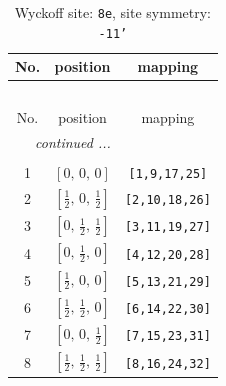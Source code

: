 \documentclass[fleqn,8pt]{jsarticle}
\begin{document}
\renewcommand{\arraystretch}{1.2}
\begin{longtable}{ccc}
\caption{Wyckoff site: {\tt 8e}, site symmetry: {\tt -11'}}
 \\
 \hline \hline
No. & position & mapping \\ \hline \endfirsthead

\multicolumn{2}{l}{\tablename\ \thetable{}} \\
 \hline \hline
No. & position & mapping \\ \hline \endhead

 \hline \hline
\multicolumn{2}{r}{\footnotesize\it continued ...} \\ \endfoot

 \hline \hline
\multicolumn{2}{r}{} \\ \endlastfoot

1 & $\left[ 0,\, 0,\, 0 \right]$ & {\tt [1,9,17,25]} \\ \hline
2 & $\left[ \frac{1}{2},\, 0,\, \frac{1}{2} \right]$ & {\tt [2,10,18,26]} \\ \hline
3 & $\left[ 0,\, \frac{1}{2},\, \frac{1}{2} \right]$ & {\tt [3,11,19,27]} \\ \hline
4 & $\left[ 0,\, \frac{1}{2},\, 0 \right]$ & {\tt [4,12,20,28]} \\ \hline
5 & $\left[ \frac{1}{2},\, 0,\, 0 \right]$ & {\tt [5,13,21,29]} \\ \hline
6 & $\left[ \frac{1}{2},\, \frac{1}{2},\, 0 \right]$ & {\tt [6,14,22,30]} \\ \hline
7 & $\left[ 0,\, 0,\, \frac{1}{2} \right]$ & {\tt [7,15,23,31]} \\ \hline
8 & $\left[ \frac{1}{2},\, \frac{1}{2},\, \frac{1}{2} \right]$ & {\tt [8,16,24,32]} \\
\end{longtable}
\renewcommand{\arraystretch}{1.2}
\end{document}
